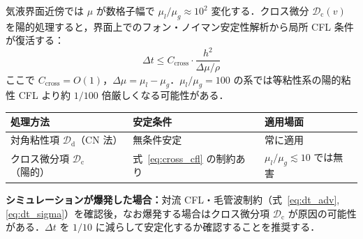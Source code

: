 \begin{tcolorbox}[warnbox, title={変粘性界面でのクロス微分陽的処理：粘性 CFL 条件の実質的復活}]
\label{warn:cross_cfl}

気液界面近傍では $\mu$ が数格子幅で $\mu_l/\mu_g \approx 10^2$ 変化する．クロス微分 $\mathcal{D}_{\mathrm{c}}(v)$ を陽的処理すると，界面上でのフォン・ノイマン安定性解析から局所 CFL 条件が復活する：
\begin{equation}
  \Delta t \le C_{\mathrm{cross}} \cdot \frac{h^2}{\Delta\mu / \rho}
  \label{eq:cross_cfl}
\end{equation}
ここで $C_{\mathrm{cross}} = O(1)$，$\Delta\mu = \mu_l - \mu_g$．$\mu_l/\mu_g = 100$ の系では等粘性系の陽的粘性 CFL より約 $1/100$ 倍厳しくなる可能性がある．

\begin{center}
\renewcommand{\arraystretch}{1.3}
\begin{tabular}{lll}
\hline
処理方法 & 安定条件 & 適用場面 \\
\hline
対角粘性項 $\mathcal{D}_{\mathrm{d}}$（CN 法） & 無条件安定 & 常に適用 \\
クロス微分項 $\mathcal{D}_{\mathrm{c}}$（陽的） & 式~\eqref{eq:cross_cfl} の制約あり & $\mu_l/\mu_g \lesssim 10$ では無害 \\
\hline
\end{tabular}
\end{center}

\textbf{シミュレーションが爆発した場合：}対流 CFL・毛管波制約（式~\eqref{eq:dt_adv},\eqref{eq:dt_sigma}）を確認後，なお爆発する場合はクロス微分項 $\mathcal{D}_{\mathrm{c}}$ が原因の可能性がある．$\Delta t$ を $1/10$ に減らして安定化するか確認することを推奨する．
\end{tcolorbox}

